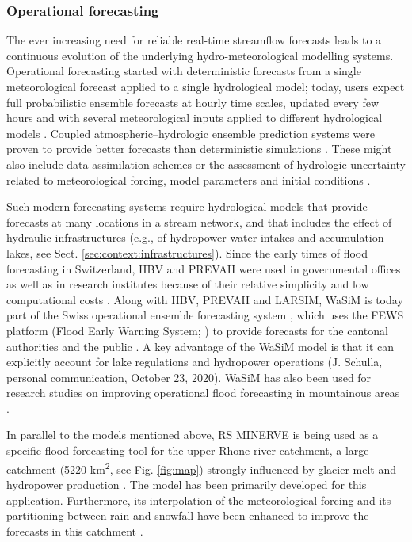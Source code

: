 \documentclass[10pt,a4paper]{article}
\begin{document}
\subsubsection{Operational forecasting}
\label{sec:context:forecasting}

The ever increasing need for reliable real-time streamflow forecasts leads to a continuous evolution of the underlying hydro-meteorological modelling systems. Operational forecasting started with deterministic forecasts from a single meteorological forecast applied to a single hydrological model; today, users expect full probabilistic ensemble forecasts at hourly time scales, updated every few hours and with several meteorological inputs applied to different hydrological models \citep{Jasper2016}. Coupled atmospheric--hydrologic ensemble prediction systems were proven to provide better forecasts than deterministic simulations \citep{Verbunt2007, Zappa2008, Jaun2008, Liechti2013}. These might also include data assimilation schemes \citep{JorgHess2015a} or the assessment of hydrologic uncertainty related to meteorological forcing, model parameters and initial conditions \citep{Jaun2009, Zappa2011a, Fundel2011}.

Such modern forecasting systems require hydrological models that provide forecasts at many locations in a stream network, and that includes the effect of hydraulic infrastructures (e.g., of hydropower water intakes and accumulation lakes, see Sect. \ref{sec:context:infrastructures}). Since the early times of flood forecasting in Switzerland, HBV and PREVAH were used in governmental offices \citep{Jasper2016} as well as in research institutes because of their relative simplicity and low computational costs \citep{Verbunt2006, Addor2011, Murphy2019, Antonetti2019}. Along with HBV, PREVAH and LARSIM, WaSiM is today part of the Swiss operational ensemble forecasting system \citep{Jasper2016}, which uses the FEWS platform (Flood Early Warning System; \citealp{Werner2013}) to provide forecasts for the cantonal authorities and the public \citep{FOEN2019}. A key advantage of the WaSiM model is that it can explicitly account for lake regulations and hydropower operations (J. Schulla, personal communication, October 23, 2020). WaSiM has also been used for research studies on improving operational flood forecasting in mountainous areas \citep{Jasper2002, Jasper2003, Ahrens2003a, Ahrens2003b}.

In parallel to the models mentioned above, RS MINERVE is being used as a specific flood forecasting tool for the upper Rhone river catchment, a large catchment (5220 km\textsuperscript{2}, see Fig. \ref{fig:map}) strongly influenced by glacier melt and hydropower production \citep{GarciaHernandez2009b, GarciaHernandez2009, Jordan2010}. The model has been primarily developed for this application. Furthermore, its interpolation of the meteorological forcing and its partitioning between rain and snowfall have been enhanced to improve the forecasts in this catchment \citep{Tobin2011, Tobin2012}.
\end{document}
